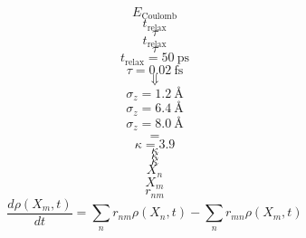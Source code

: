 \documentclass{scrreprt}
\begin{document}
\begin{equation}
E_\text{Coulomb}
\end{equation}
\begin{equation}
t_\text{relax}
\end{equation}
\begin{equation}
\tau
\end{equation}
\begin{equation}
t_\text{relax}
\end{equation}
\begin{equation}
\tau
\end{equation}
\begin{equation}
 t_\text{relax}=\SI{50}{\pico\second}
\end{equation}
\begin{equation}
\tau=\SI{0.02}{\femto\second}
\end{equation}
\begin{equation}
\Downarrow
\end{equation}
\begin{equation}
\sigma_z = \SI{1.2}{\angstrom}
\end{equation}
\begin{equation}
\sigma_z = \SI{6.4}{\angstrom}
\end{equation}
\begin{equation}
\sigma_z = \SI{8.0}{\angstrom}
\end{equation}
\begin{equation}
\hat{=}
\end{equation}
\begin{equation}
\kappa=\num{3.9}
\end{equation}
\begin{equation}
\kappa
\end{equation}
\begin{equation}
\kappa
\end{equation}
\begin{equation}
\kappa
\end{equation}
\begin{equation}
X_n
\end{equation}
\begin{equation}
X_m
\end{equation}
\begin{equation}
r_{n m}
\end{equation}
\begin{equation}
  \frac{d \rho(X_m,t)}{d t} = \sum_n{r_{n m}\rho(X_n,t) - \sum_n{r_{m n}\rho(X_m,t)}}
\end{equation}
\end{document}
